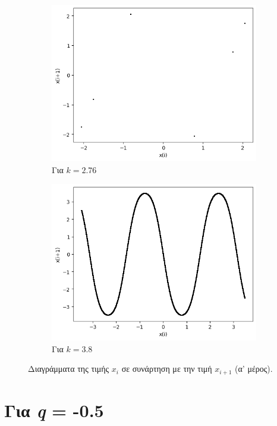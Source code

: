 \begin{figure}[ht]
\begin{subfigure}[b]{0.4\textwidth}
		\includegraphics[width=\textwidth]{LateX images/sine q=-0.3/g7}
		\caption{Για $k=2.76$}
		\label{f:k120}
	\end{subfigure}
	\hfill
		\begin{subfigure}[b]{0.4\textwidth}
		\centering
		\includegraphics[width=\textwidth]{LateX images/sine q=-0.3/g20}
		\caption{Για $k=3.8$}
		\label{f:k126}
	\end{subfigure}
	\hfill		
	\caption{Διαγράμματα της τιμής \(x_i\) σε συνάρτηση με την τιμή \(x_{i+1}\) (α' μέρος).}
	\label{f:k246}
\end{figure}

\clearpage 
\section{Για \emph{q} = -0.5}

